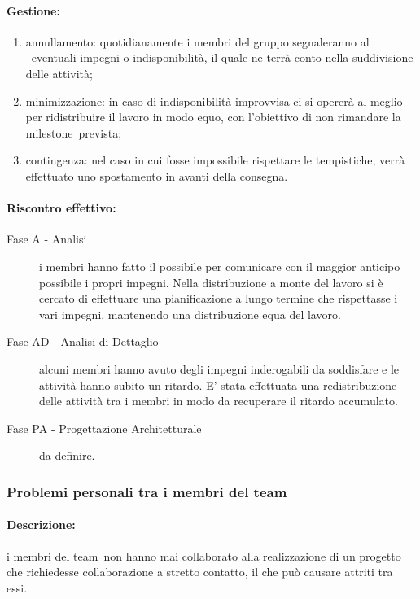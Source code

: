 \documentclass[../PianoProgetto.tex]{subfiles}
\begin{document}
	\paragraph*{Gestione:}
	\begin{enumerate}
		\item annullamento: quotidianamente i membri del gruppo segnaleranno al \responsabilediprogetto\ eventuali impegni o indisponibilità, il quale ne terrà conto nella suddivisione delle attività;
		\item minimizzazione: in caso di indisponibilità improvvisa ci si opererà al meglio per ridistribuire il lavoro in modo equo, con l'obiettivo di non rimandare la milestone\g\ prevista;
		\item contingenza: nel caso in cui fosse impossibile rispettare le tempistiche, verrà effettuato uno spostamento in avanti della consegna.
	\end{enumerate}
			
	\paragraph*{Riscontro effettivo:}
		\begin{description}
			\item[Fase A - Analisi] i membri hanno fatto il possibile per comunicare con il maggior anticipo possibile i propri impegni. Nella distribuzione a monte del lavoro si è cercato di effettuare una pianificazione a lungo termine che rispettasse i vari impegni, mantenendo una distribuzione equa del lavoro.
			\item[Fase AD - Analisi di Dettaglio] alcuni membri hanno avuto degli impegni inderogabili da soddisfare e le attività hanno subito un ritardo. E' stata effettuata una redistribuzione delle attività tra i membri in modo da recuperare il ritardo accumulato. 
			\item[Fase PA - Progettazione Architetturale] da definire.
		\end{description}
	
\subsubsection{Problemi personali tra i membri del team}
\label{sec:Problemi personali tra i membri del team}

	\paragraph*{Descrizione:} i membri del team\g\ non hanno mai collaborato alla realizzazione di un progetto che richiedesse collaborazione a stretto contatto, il che può causare attriti tra essi.
	
\end{document}
